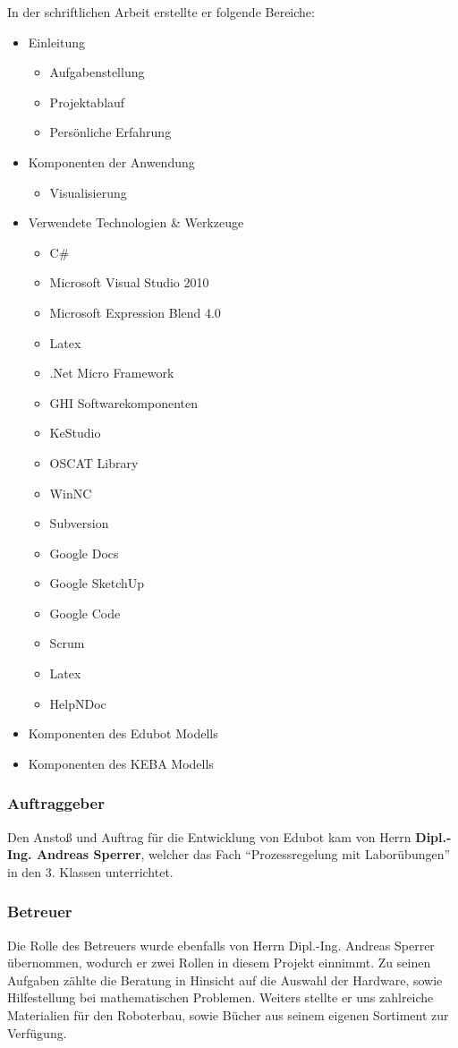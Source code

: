 \begin{itemize}
In der schriftlichen Arbeit erstellte er folgende Bereiche:
\begin{itemize}
\item Einleitung
\begin{itemize}
\item Aufgabenstellung
\item Projektablauf
\item Persönliche Erfahrung
\end{itemize}
\item Komponenten der Anwendung
\begin{itemize}
\item Visualisierung
\end{itemize}
\item Verwendete Technologien \& Werkzeuge
\begin{itemize}
\item C\#
\item Microsoft Visual Studio 2010
\item Microsoft Expression Blend 4.0
\item Latex
\item .Net Micro Framework
\item GHI Softwarekomponenten
\item KeStudio
\item OSCAT Library
\item WinNC
\item Subversion
\item Google Docs
\item Google SketchUp
\item Google Code
\item Scrum
\item Latex
\item HelpNDoc
\end{itemize}
\item Komponenten des Edubot Modells
\item Komponenten des KEBA Modells
\end{itemize}
     

\end{itemize}
   
\subsubsection{Auftraggeber}
Den Anstoß und Auftrag für die Entwicklung von Edubot kam von Herrn \textbf{Dipl.-Ing. Andreas Sperrer}, welcher das Fach “Prozessregelung mit Laborübungen” in den 3. Klassen unterrichtet.

\subsubsection{Betreuer}
Die Rolle des Betreuers wurde ebenfalls von Herrn Dipl.-Ing. Andreas Sperrer übernommen, wodurch er zwei Rollen in diesem Projekt einnimmt. Zu seinen Aufgaben zählte die Beratung in Hinsicht auf die Auswahl der Hardware, sowie Hilfestellung bei mathematischen Problemen. Weiters stellte er uns zahlreiche Materialien für den Roboterbau, sowie Bücher aus seinem eigenen Sortiment zur Verfügung.

